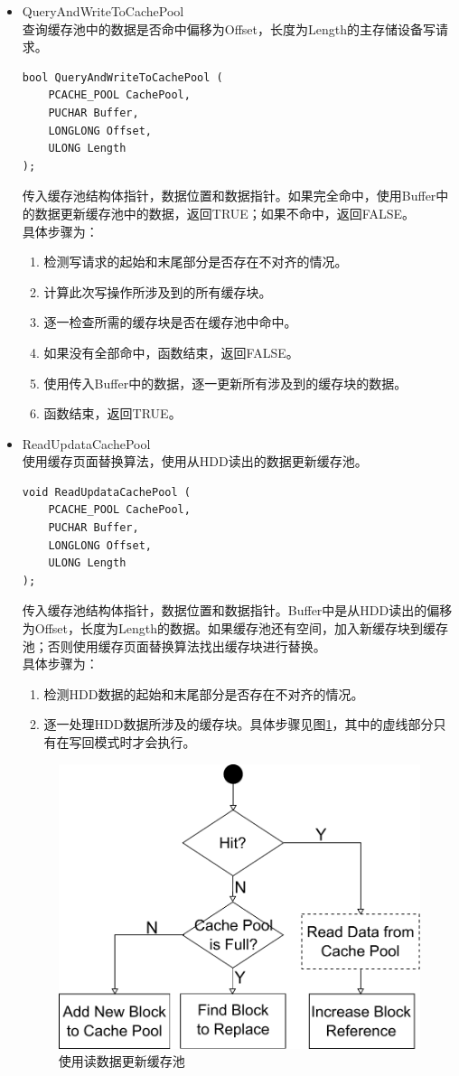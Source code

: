 \begin{itemize}
\item QueryAndWriteToCachePool
\\查询缓存池中的数据是否命中偏移为Offset，长度为Length的主存储设备写请求。
\begin{lstlisting}
bool QueryAndWriteToCachePool (
    PCACHE_POOL CachePool,
    PUCHAR Buffer,
    LONGLONG Offset,
    ULONG Length
);
\end{lstlisting}
传入缓存池结构体指针，数据位置和数据指针。如果完全命中，使用Buffer中的数据更新缓存池中的数据，返回TRUE；如果不命中，返回FALSE。
\\具体步骤为：
\begin{enumerate}
\item 检测写请求的起始和末尾部分是否存在不对齐的情况。
\item 计算此次写操作所涉及到的所有缓存块。
\item 逐一检查所需的缓存块是否在缓存池中命中。
\item 如果没有全部命中，函数结束，返回FALSE。
\item 使用传入Buffer中的数据，逐一更新所有涉及到的缓存块的数据。
\item 函数结束，返回TRUE。
\end{enumerate}

\item ReadUpdataCachePool
\\使用缓存页面替换算法，使用从HDD读出的数据更新缓存池。
\begin{lstlisting}
void ReadUpdataCachePool (
    PCACHE_POOL CachePool,
    PUCHAR Buffer,
    LONGLONG Offset,
    ULONG Length
);
\end{lstlisting}
传入缓存池结构体指针，数据位置和数据指针。Buffer中是从HDD读出的偏移为Offset，长度为Length的数据。如果缓存池还有空间，加入新缓存块到缓存池；否则使用缓存页面替换算法找出缓存块进行替换。
\\具体步骤为：
\begin{enumerate}
\item 检测HDD数据的起始和末尾部分是否存在不对齐的情况。
\item 逐一处理HDD数据所涉及的缓存块。具体步骤见图\ref{fig:read-update-pool}，其中的虚线部分只有在写回模式时才会执行。
\end{enumerate}
\begin{figure}[H]
\centering
\includegraphics[width=0.6\linewidth]{./graph/read-update-pool}
\caption{使用读数据更新缓存池}
\label{fig:read-update-pool}
\end{figure}


\end{itemize}
